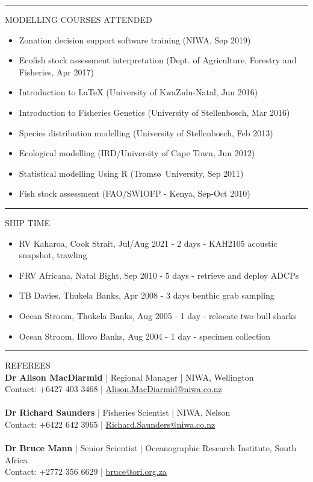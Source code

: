 \documentclass[10pt,a4paper]{article}
\begin{document}
\hrule
\vspace{6pt}
\noindent
MODELLING COURSES ATTENDED
	\begin{itemize}
		\setlength\itemsep{0.05em}
		\item Zonation decision support software training (NIWA, Sep 2019)
		\item Ecofish stock assessment interpretation (Dept. of Agriculture, Forestry and Fisheries, Apr 2017)
		\item Introduction to \LaTeX{} (University of KwaZulu-Natal, Jun 2016)
		\item Introduction to Fisheries Genetics (University of Stellenbosch, Mar 2016)
		\item Species distribution modelling (University of Stellenbosch, Feb 2013) 
		\item Ecological modelling (IRD/University of Cape Town, Jun 2012)
		\item Statistical modelling Using R (Troms\o\ University, Sep 2011)
		\item Fish stock assessment (FAO/SWIOFP - Kenya, Sep-Oct 2010)
	\end{itemize}
\hrule
\vspace{6pt}
\noindent
SHIP TIME
	\begin{itemize}
		\setlength\itemsep{0.05em}
		\item RV Kaharoa, Cook Strait, Jul/Aug 2021 - 2 days - KAH2105 acoustic snapshot, trawling
		\item FRV Africana, Natal Bight, Sep 2010 - 5 days - retrieve and deploy ADCPs
		\item TB Davies, Thukela Banks, Apr 2008 - 3 days benthic grab sampling
		\item Ocean Stroom, Thukela Banks, Aug 2005 - 1 day - relocate two bull sharks
		\item Ocean Stroom, Illovo Banks, Aug 2004 - 1 day - specimen collection
	\end{itemize}
\hrule
\vspace{6pt}
\noindent
REFEREES
\\
\textbf{Dr Alison MacDiarmid} | Regional Manager | NIWA, Wellington\\
Contact: +6427 403 3468 | \href{mailto:Alison.MacDiarmid@niwa.co.nz}{Alison.MacDiarmid@niwa.co.nz}\\
\\
\textbf{Dr Richard Saunders} | Fisheries Scientist | NIWA, Nelson\\
Contact: +6422 642 3965 | \href{mailto:Richard.Saunders@niwa.co.nz}{Richard.Saunders@niwa.co.nz}\\
\\
\noindent
\textbf{Dr Bruce Mann} | Senior Scientist | Oceanographic Research Institute, South Africa\\
Contact: +2772 356 6629 | \href{mailto:bruce@ori.org.za}{bruce@ori.org.za}\\
\\
\noindent
\end{document}
